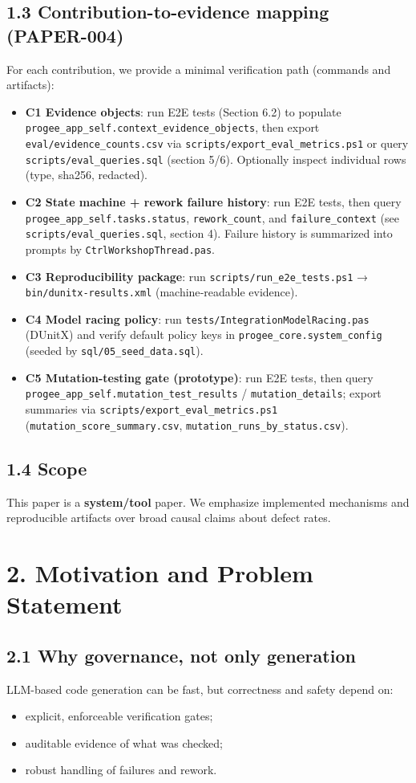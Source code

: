\documentclass[11pt]{article}
\begin{document}
\subsection{1.3 Contribution-to-evidence mapping (PAPER-004)}
For each contribution, we provide a minimal verification path (commands and artifacts):
\begin{itemize}
\item \textbf{C1 Evidence objects}: run E2E tests (Section 6.2) to populate \texttt{progee\_app\_self.context\_evidence\_objects}, then export \texttt{eval/evidence\_counts.csv} via \texttt{scripts/export\_eval\_metrics.ps1} or query \texttt{scripts/eval\_queries.sql} (section 5/6). Optionally inspect individual rows (type, sha256, redacted).
\item \textbf{C2 State machine + rework failure history}: run E2E tests, then query \texttt{progee\_app\_self.tasks.status}, \texttt{rework\_count}, and \texttt{failure\_context} (see \texttt{scripts/eval\_queries.sql}, section 4). Failure history is summarized into prompts by \texttt{CtrlWorkshopThread.pas}.
\item \textbf{C3 Reproducibility package}: run \texttt{scripts/run\_e2e\_tests.ps1} → \texttt{bin/dunitx-results.xml} (machine‑readable evidence).
\item \textbf{C4 Model racing policy}: run \texttt{tests/IntegrationModelRacing.pas} (DUnitX) and verify default policy keys in \texttt{progee\_core.system\_config} (seeded by \texttt{sql/05\_seed\_data.sql}).
\item \textbf{C5 Mutation-testing gate (prototype)}: run E2E tests, then query \texttt{progee\_app\_self.mutation\_test\_results} / \texttt{mutation\_details}; export summaries via \texttt{scripts/export\_eval\_metrics.ps1} (\texttt{mutation\_score\_summary.csv}, \texttt{mutation\_runs\_by\_status.csv}).
\end{itemize}

\subsection{1.4 Scope}
This paper is a \textbf{system/tool} paper. We emphasize implemented mechanisms and reproducible artifacts over broad causal claims about defect rates.

\section{2. Motivation and Problem Statement}
\subsection{2.1 Why governance, not only generation}
LLM-based code generation can be fast, but correctness and safety depend on:
\begin{itemize}
\item explicit, enforceable verification gates;
\item auditable evidence of what was checked;
\item robust handling of failures and rework.
\end{itemize}
\end{document}
